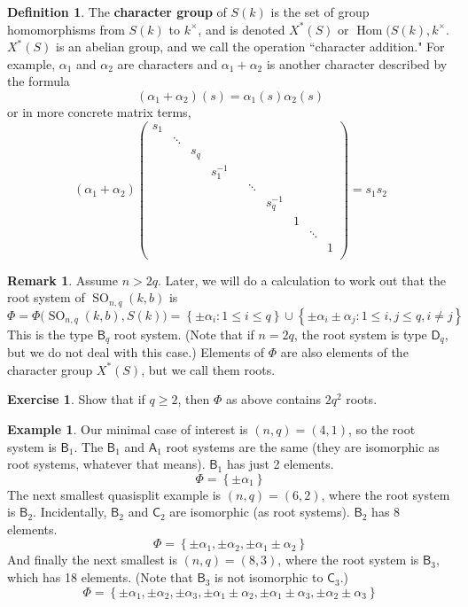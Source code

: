 \documentclass[12pt]{article}
\theoremstyle{definition}
\newtheorem{definition}[theorem]{Definition}
\newtheorem{example}[theorem]{Example}
\newtheorem{remark}[theorem]{Remark}
\newtheorem{exercise}[theorem]{Exercise}
\numberwithin{theorem}{subsection}
\newcommand{\lb}{\left\{}
\newcommand{\rb}{\right\}}
\newcommand{\tbf}{\textbf}
\newcommand{\inv}{^{-1}}
\DeclareMathOperator{\Hom}{Hom}
\DeclareMathOperator{\SO}{SO}
\begin{document}
\begin{definition}
The \tbf{character group} of $S(k)$ is the set of group homomorphisms from $S(k)$ to $k^\times$, and is denoted $X^*(S)$ or $\Hom(S(k), k^\times$. $X^*(S)$ is an abelian group, and we call the operation ``character addition." For example, $\alpha_1$ and $\alpha_2$ are characters and $\alpha_1 + \alpha_2$ is another character described by the formula
\[
	(\alpha_1 + \alpha_2)(s) = \alpha_1(s) \alpha_2(s)
\]
or in more concrete matrix terms,
\[
	(\alpha_1 + \alpha_2)
	\begin{pmatrix}
		s_1 \\
		& \ddots \\
		&& s_q \\
		&&& s_1 \inv \\
		&&&&& \ddots \\
		&&&&&& s_q \inv \\
		&&&&&&& 1 \\
		&&&&&&&& \ddots \\
		&&&&&&&&& 1 \\
	\end{pmatrix}
	= s_1 s_2
\]
\end{definition}

\begin{remark}
Assume $n > 2q$. Later, we will do a calculation to work out that the root system of $\SO_{n,q}(k,b)$ is
\[
	\Phi = \Phi \Big( \SO_{n,q}(k,b), S(k) \Big) = \lb \pm \alpha_i : 1 \le i \le q \rb \cup \lb \pm \alpha_i \pm \alpha_j : 1 \le i,j \le q, i \neq j \rb
\]
This is the type $\mathsf{B}_q$ root system. (Note that if $n=2q$, the root system is type $\mathsf{D}_q$, but we do not deal with this case.) Elements of $\Phi$ are also elements of the character group $X^*(S)$, but we call them roots.
\end{remark}

\begin{exercise}
Show that if $q \ge 2$, then $\Phi$ as above contains $2q^2$ roots.
\end{exercise}

\begin{example}
Our minimal case of interest is $(n,q) = (4,1)$, so the root system is $\mathsf{B}_1$. The $\mathsf{B}_1$ and $\mathsf{A}_1$ root systems are the same (they are isomorphic as root systems, whatever that means). $\mathsf{B}_1$ has just 2 elements.
\[
	\Phi = \lb \pm \alpha_1 \rb
\]
The next smallest quasisplit example is $(n,q) = (6,2)$, where the root system is $\mathsf{B}_2$. Incidentally, $\mathsf{B}_2$ and $\mathsf{C}_2$ are isomorphic (as root systems). $\mathsf{B}_2$ has 8 elements.
\[
	\Phi = \lb \pm \alpha_1, \pm \alpha_2, \pm \alpha_1 \pm \alpha_2 \rb
\]
And finally the next smallest is $(n,q) = (8,3)$, where the root system is $\mathsf{B}_3$, which has 18 elements. (Note that $\mathsf{B}_3$ is not isomorphic to $\mathsf{C}_3$.)
\[
	\Phi = \lb \pm \alpha_1, \pm \alpha_2, \pm \alpha_3, \pm \alpha_1 \pm \alpha_2, \pm \alpha_1 \pm \alpha_3, \pm \alpha_2 \pm \alpha_3 \rb
\]
\end{example}
\end{document}

